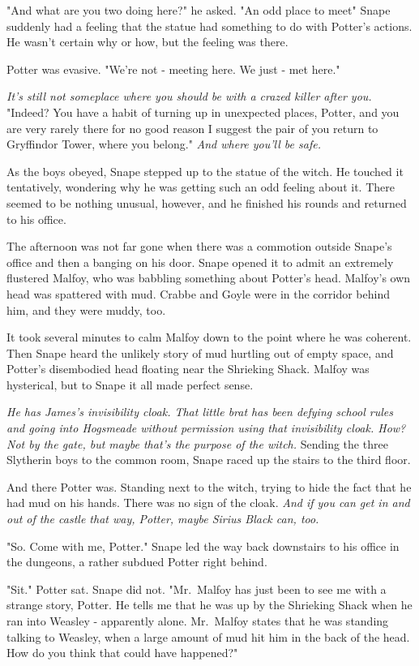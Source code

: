 "And what are you two doing here?" he asked. "An odd place to meet{\el}" Snape suddenly had a feeling that the statue had something to do with Potter's actions. He wasn't certain why or how, but the feeling was there.

Potter was evasive. "We're not - meeting here. We just - met here."

\emph{It's still not someplace where you should be with a crazed killer after you.} "Indeed? You have a habit of turning up in unexpected places, Potter, and you are very rarely there for no good reason{\el} I suggest the pair of you return to Gryffindor Tower, where you belong." \emph{And where you'll be safe.}

As the boys obeyed, Snape stepped up to the statue of the witch. He touched it tentatively, wondering why he was getting such an odd feeling about it. There seemed to be nothing unusual, however, and he finished his rounds and returned to his office.

The afternoon was not far gone when there was a commotion outside Snape's office and then a banging on his door. Snape opened it to admit an extremely flustered Malfoy, who was babbling something about Potter's head. Malfoy's own head was spattered with mud. Crabbe and Goyle were in the corridor behind him, and they were muddy, too.

It took several minutes to calm Malfoy down to the point where he was coherent. Then Snape heard the unlikely story of mud hurtling out of empty space, and Potter's disembodied head floating near the Shrieking Shack. Malfoy was hysterical, but to Snape it all made perfect sense.

\emph{He has James's invisibility cloak. That little brat has been defying school rules and going into Hogsmeade without permission using that invisibility cloak. How{\el}? Not by the gate, but maybe that's the purpose of the witch.} Sending the three Slytherin boys to the common room, Snape raced up the stairs to the third floor.

And there Potter was. Standing next to the witch, trying to hide the fact that he had mud on his hands. There was no sign of the cloak. \emph{And if you can get in and out of the castle that way, Potter, maybe Sirius Black can, too.}

"So. Come with me, Potter." Snape led the way back downstairs to his office in the dungeons, a rather subdued Potter right behind.

"Sit." Potter sat. Snape did not. "Mr.~Malfoy has just been to see me with a strange story, Potter. He tells me that he was up by the Shrieking Shack when he ran into Weasley - apparently alone. Mr.~Malfoy states that he was standing talking to Weasley, when a large amount of mud hit him in the back of the head. How do you think that could have happened?"

